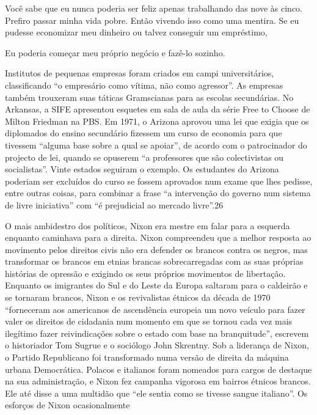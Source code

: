  \par 
Você sabe que eu nunca poderia ser feliz apenas trabalhando das nove às cinco. Prefiro passar minha vida pobre. Então vivendo isso como uma mentira. Se eu pudesse economizar meu dinheiro ou talvez conseguir um empréstimo,
 \par 
Eu poderia começar meu próprio negócio e fazê-lo sozinho.
 \par 
Institutos de pequenas empresas foram criados em campi universitários, classificando “o empresário como vítima, não como agressor”. As empresas também trouxeram suas táticas Gramscianas para as escolas secundárias. No Arkansas, a SIFE apresentou esquetes em sala de aula da série Free to Choose de Milton Friedman na PBS. Em 1971, o Arizona aprovou uma lei que exigia que os diplomados do ensino secundário fizessem um curso de economia para que tivessem “alguma base sobre a qual se apoiar”, de acordo com o patrocinador do projecto de lei, quando se opuserem “a professores que são colectivistas ou socialistas”. Vinte estados seguiram o exemplo. Os estudantes do Arizona poderiam ser excluídos do curso se fossem aprovados num exame que lhes pedisse, entre outras coisas, para combinar a frase “a intervenção do governo num sistema de livre iniciativa” com “é prejudicial ao mercado livre”.{\color{blue}26}
 \par 
O mais ambidestro dos políticos, Nixon era mestre em falar para a esquerda enquanto caminhava para a direita. Nixon compreendeu que a melhor resposta ao movimento pelos direitos civis não era defender os brancos contra os negros, mas transformar os brancos em etnias brancas sobrecarregadas com as suas próprias histórias de opressão e exigindo os seus próprios movimentos de libertação. Enquanto os imigrantes do Sul e do Leste da Europa saltaram para o caldeirão e se tornaram brancos, Nixon e os revivalistas étnicos da década de 1970 “forneceram aos americanos de ascendência europeia um novo veículo para fazer valer os direitos de cidadania num momento em que se tornou cada vez mais ilegítimo fazer reivindicações sobre o estado com base na branquitude”, escrevem o historiador Tom Sugrue e o sociólogo John Skrentny. Sob a liderança de Nixon, o Partido Republicano foi transformado numa versão de direita da máquina urbana Democrática. Polacos e italianos foram nomeados para cargos de destaque na sua administração, e Nixon fez campanha vigorosa em bairros étnicos brancos. Ele até disse a uma multidão que “ele sentia como se tivesse sangue italiano”. Os esforços de Nixon ocasionalmente
 \par 
